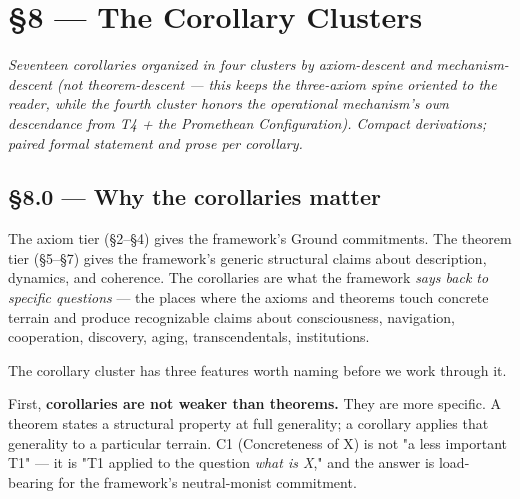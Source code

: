 \documentclass[11pt, openany]{book}
\newcommand{\sectionbreak}{\clearpage}
\begin{document}
\chapter{§8 — The Corollary Clusters}


\textit{Seventeen corollaries organized in four clusters by axiom-descent and mechanism-descent (not theorem-descent --- this keeps the three-axiom spine oriented to the reader, while the fourth cluster honors the operational mechanism's own descendance from T4 + the Promethean Configuration). Compact derivations; paired formal statement and prose per corollary.}

\sectionbreak

\section{§8.0 --- Why the corollaries matter}

The axiom tier (§2–§4) gives the framework's Ground commitments. The theorem tier (§5–§7) gives the framework's generic structural claims about description, dynamics, and coherence. The corollaries are what the framework \textit{says back to specific questions} --- the places where the axioms and theorems touch concrete terrain and produce recognizable claims about consciousness, navigation, cooperation, discovery, aging, transcendentals, institutions.

The corollary cluster has three features worth naming before we work through it.

First, \textbf{corollaries are not weaker than theorems.} They are more specific. A theorem states a structural property at full generality; a corollary applies that generality to a particular terrain. C1 (Concreteness of X) is not "a less important T1" --- it is "T1 applied to the question \textit{what is X}," and the answer is load-bearing for the framework's neutral-monist commitment.
\end{document}
